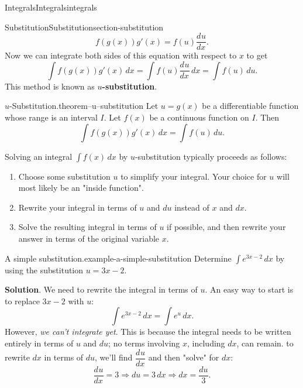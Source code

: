 \documentclass[oneside,10pt,]{book}
\newcommand{\terminology}[1]{\textbf{#1}}
\numberwithin{equation}{section}
\newcommand{\dv}[3][]{\dfrac{d^{#1} #2}{d #3^{#1}}}
\begin{document}
\begin{chapterptx}{Integrals}{}{Integrals}{}{}{integrals}
\begin{sectionptx}{Substitution}{}{Substitution}{}{}{section-substitution}
\begin{equation*}
f(g(x))g'(x) = f(u)\dv{u}{x}.
\end{equation*}
Now we can integrate both sides of this equation with respect to \(x\) to get%
\begin{equation*}
\int f(g(x))g'(x)\,dx = \int f(u)\dv{u}{x}\,dx = \int f(u)\,du.
\end{equation*}
This method is known as \terminology{\(u\)-substitution}.%
\begin{theorem}{\(u\)-Substitution.}{}{theorem--u--substitution}%
\hypertarget{p-479}{}%
Let \(u = g(x)\) be a differentiable function whose range is an interval \(I\). Let \(f(x)\) be a continuous function on \(I\). Then%
\begin{equation*}
\int f(g(x))g'(x)\,dx = \int f(u)\,du.
\end{equation*}
%
\end{theorem}
\hypertarget{p-480}{}%
Solving an integral \(\int f(x)\,dx\) by \(u\)-substitution typically proceeds as follows:\leavevmode%
\begin{enumerate}
\item\hypertarget{li-42}{}Choose some substitution \(u\) to simplify your integral. Your choice for \(u\) will most likely be an "inside function".%
\item\hypertarget{li-43}{}Rewrite your integral in terms of \(u\) and \(du\) instead of \(x\) and \(dx\).%
\item\hypertarget{li-44}{}Solve the resulting integral in terms of \(u\) if possible, and then rewrite your answer in terms of the original variable \(x\).%
\end{enumerate}
%
\begin{example}{A simple substitution.}{example-a-simple-substitution}%
\hypertarget{p-481}{}%
Determine \(\int e^{3x - 2}\,dx\) by using the substitution \(u = 3x - 2\).%
\par\smallskip%
\noindent\textbf{Solution}.\hypertarget{solution-105}{}\quad%
\hypertarget{p-482}{}%
We need to rewrite the integral in terms of \(u\). An easy way to start is to replace \(3x-2\) with \(u\):%
\begin{equation*}
\int e^{3x-2}\,dx = \int e^{u}\,dx.
\end{equation*}
However, \emph{we can't integrate yet}. This is because the integral needs to be written entirely in terms of \(u\) and \(du\); no terms involving \(x\), including \(dx\), can remain. to rewrite \(dx\) in terms of \(du\), we'll find \(\dv{u}{x}\) and then "solve" for \(dx\):%
\begin{equation*}
\dv{u}{x} = 3 \Rightarrow du = 3\,dx \Rightarrow dx = \frac{du}{3}.

\end{equation*}
\end{example}
\end{sectionptx}
\end{chapterptx}
\end{document}
